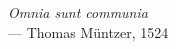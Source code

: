 \thispagestyle{empty}
{}

\vspace*{3cm}

\begin{flushright}
    \emph{Omnia sunt communia} \\ \medskip
    --- Thomas Müntzer, 1524
\end{flushright}
